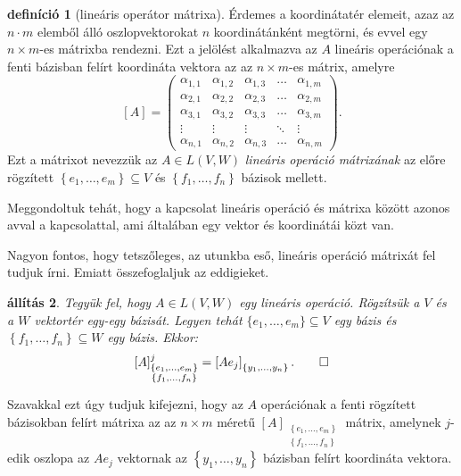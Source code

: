 \documentclass[a4paper, showtrims]{memoir}
\theoremstyle{plain}
\newtheorem{proposition}{állítás}[chapter]
\theoremstyle{remark}
\theoremstyle{definition}
\newtheorem{definition}[proposition]{definíció}
\begin{document}
\begin{definition}[lineáris operátor mátrixa]
	Érdemes a koordinátatér elemeit, azaz az $n\cdot m$ elemből álló oszlopvektorokat $n$ koordinátánként megtörni,
	és evvel egy $n\times m$-es mátrixba rendezni.
	Ezt a jelölést alkalmazva az $A$ lineáris operációnak a fenti bázisban felírt koordináta vektora az az
	$n\times m$-es mátrix,
	amelyre
	\[
		[A]=
		\begin{pmatrix}
			\alpha_{1,1} & \alpha_{1,2} & \alpha_{1,3} & \dots  & \alpha_{1,m} \\
			\alpha_{2,1} & \alpha_{2,2} & \alpha_{2,3} & \dots  & \alpha_{2,m} \\
			\alpha_{3,1} & \alpha_{3,2} & \alpha_{3,3} & \dots  & \alpha_{3,m} \\
			\vdots       & \vdots       & \vdots       & \ddots & \vdots       \\
			\alpha_{n,1} & \alpha_{n,2} & \alpha_{n,3} & \dots  & \alpha_{n,m}
		\end{pmatrix}.
	\]
	Ezt a mátrixot nevezzük az
	$A\in L\left( V,W \right)$ \emph{lineáris operáció mátrixának}
	az előre rögzített
	$\left\{e_1,\ldots,e_m  \right\}\subseteq V$ és $\left\{ f_1,\ldots,f_n \right\}$ bázisok mellett.
\end{definition}
Meggondoltuk tehát, hogy a kapcsolat lineáris operáció és mátrixa között azonos avval a kapcsolattal,
ami általában egy vektor és koordinátái közt van.

Nagyon fontos, hogy tetszőleges, az utunkba eső, lineáris operáció mátrixát fel tudjuk írni.
Emiatt összefoglaljuk az eddigieket.
\begin{proposition}
	Tegyük fel, hogy $A\in L\left( V,W \right)$ egy lineáris operáció.
	Rögzítsük a $V$ és a $W$ vektortér egy-egy bázisát.
	Legyen tehát $\{e_1,\ldots,e_m\}\subseteq V$ egy bázis és
	$\left\{ f_1,\ldots,f_n \right\}\subseteq W$ egy bázis.
    Ekkor:
	\[
		[A]_{\substack{\left\{ e_1,\ldots,e_m \right\}\\ \left\{ f_1,\ldots,f_n \right\}}}^j
		=
		\left[ Ae_j \right]_{\left\{ y_1,\ldots,y_n \right\}}.
		\qedhere
	\]
\end{proposition}
Szavakkal ezt úgy tudjuk kifejezni, hogy 
	az $A$ operációnak a fenti rögzített bázisokban felírt mátrixa az az
	$n\times m$ méretű
	$[A]_{\substack{\left\{ e_1,\ldots,e_m \right\}\\ \left\{ f_1,\ldots,f_n \right\}}}$
	mátrix,
	amelynek $j$-edik oszlopa az $Ae_j$ vektornak az $\left\{ y_1,\ldots,y_n \right\}$ bázisban felírt koordináta vektora.
    
\end{document}
